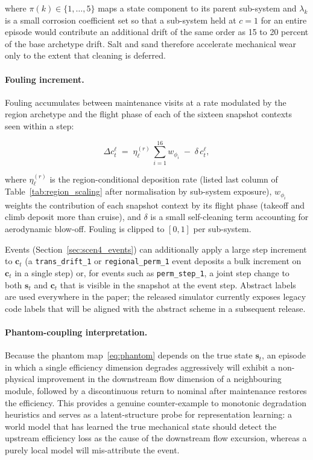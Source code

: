where $\pi(k) \in \{1,\ldots,5\}$ maps a state component to its
parent sub-system and $\lambda_k$ is a small corrosion coefficient
set so that a sub-system held at $c = 1$ for an entire episode would
contribute an additional drift of the same order as 15 to 20 percent
of the base archetype drift. Salt and sand therefore accelerate
mechanical wear only to the extent that cleaning is deferred.

\paragraph{Fouling increment.}
Fouling accumulates between maintenance visits at a rate
modulated by the region archetype and the flight phase of each of the
sixteen snapshot contexts seen within a step:

\begin{equation}
  \Delta c^\ell_t \;=\; \eta^{(r)}_\ell\, \sum_{i=1}^{16} w_{\phi_i}
                    \;-\; \delta\, c^\ell_t,
\end{equation}

where $\eta^{(r)}_\ell$ is the region-conditional deposition rate
(listed last column of Table~\ref{tab:region_scaling} after
normalisation by sub-system exposure), $w_{\phi_i}$ weights the
contribution of each snapshot context by its flight phase (takeoff and
climb deposit more than cruise), and $\delta$ is a small self-cleaning
term accounting for aerodynamic blow-off. Fouling is clipped to
$[0, 1]$ per sub-system.

Events (Section~\ref{sec:scen4_events}) can additionally apply a large
step increment to $\mathbf{c}_t$ (a \texttt{trans\_drift\_1} or
\texttt{regional\_perm\_1} event deposits a bulk increment on
$\mathbf{c}_t$ in a single step) or, for events such as
\texttt{perm\_step\_1}, a joint step change to both $\mathbf{s}_t$
and $\mathbf{c}_t$ that is visible in the snapshot at the event step.
Abstract labels are used everywhere in the paper; the released
simulator currently exposes legacy code labels that will be aligned
with the abstract scheme in a subsequent release.

\paragraph{Phantom-coupling interpretation.}
Because the phantom map~\eqref{eq:phantom} depends on the true state
$\mathbf{s}_t$, an episode in which a single efficiency dimension
degrades aggressively will exhibit a non-physical improvement in the
downstream flow dimension of a neighbouring module, followed by a
discontinuous return to nominal after maintenance restores the
efficiency. This provides a genuine counter-example to monotonic
degradation heuristics and serves as a latent-structure probe for
representation learning: a world model that has learned the true
mechanical state should detect the upstream efficiency loss as the
cause of the downstream flow excursion, whereas a purely local model
will mis-attribute the event.

